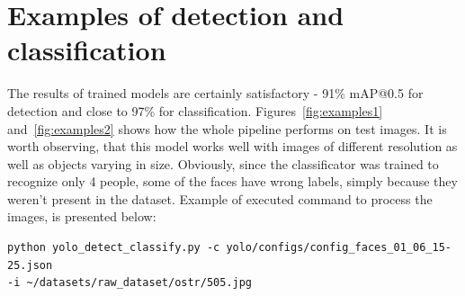 \documentclass{article}
\begin{document}
    \section{Examples of detection and classification}\label{sec:examplesOfDetectionAndClassification}

    The results of trained models are certainly satisfactory - 91\% mAP@0.5 for detection and close to 97\% for classification.
    Figures~\ref{fig:examples1} and~\ref{fig:examples2} shows how the whole pipeline performs on test images.
    It is worth observing, that this model works well with images of different resolution as well as objects varying in size.
    Obviously, since the classificator was trained to recognize only 4 people, some of the faces have wrong labels, simply because they weren't present in the dataset.
    Example of executed command to process the images, is presented below:
    \begin{verbatim}
python yolo_detect_classify.py -c yolo/configs/config_faces_01_06_15-25.json
-i ~/datasets/raw_dataset/ostr/505.jpg
    \end{verbatim}
\end{document}
